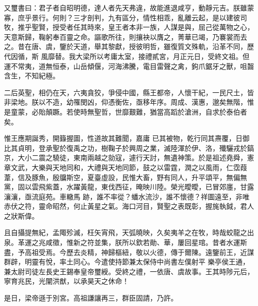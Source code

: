 \begin{pinyinscope}
 又璽書曰：君子者自昭明德，達人者先天弗違，故能進退咸亨，動靜元吉。朕雖蒙寡，庶乎景行。何則？三才剖判，九有區分，情性相乖，亂離云起，是以建彼司牧，推乎聖賢，授受者任其時來，皇王者本非一族，人謀是與，屈己從萬物之心，天意斯歸，鞠躬奉百靈之命。謳歌所往，則攘袂以膺之，菁華已竭，乃褰裳而去之。昔在唐、虞，鑒於天道，舉其黎獻，授彼明哲，雖復質文殊軌，沿革不同，歷代因循，斯
 風靡替。我大梁所以考庸太室，接禮貳宮，月正元日，受終文祖。但運不常夷，道無恒泰，山岳傾偃，河海沸騰，電目雷聲之禽，鉤爪鋸牙之獸，咀齧含生，不知紀極。



 二后英聖，相仍在天，六夷貪狡，爭侵中國，縣王都帝，人懷干紀，一民尺土，皆非梁地。朕以不造，幼罹閔凶，仰憑衡佐，亟移年序。周成、漢惠，邈矣無階，惟是童蒙，必貽顛蹶。若使時無聖哲，世靡艱難，猶當高蹈於滄洲，自求於泰伯者矣。



 惟王應期誕秀，開籙握圖，性道故其難聞，嘉庸
 已其被物，乾行同其燾覆，日御比其貞明，登承聖於復禹之功，樹鞠子於興周之業，滅陸渾於伊、洛，殲驪戎於鎬京，大小二震之驍徒，東南兩越之勍寇，遽行天討，無遺神策。於是祖述堯舜，憲章文武，大樂與天地同和，大禮與天地同節，鼓之以雷霆，潤之以風雨，仁霑葭葦，信及豚魚，殷牖斯空，夏臺虛設，民惟大畜，野有同人，升平頌平，無偏無黨，固以雲飛紫蓋，水躍黃龍，東伐西征，晻映川陸。榮光曖曖，已冒郊廛，甘露瀼瀼，亟流庭苑。車轍馬
 跡，誰不率從？蟠水流沙，誰不懷德？祥圖遠至，非唯赤伏之符，靈命昭然，何止黃星之氣。海口河目，賢聖之表既彰，握旄執鉞，君人之狀斯偉。



 且自攝提無紀，孟陬殄滅，枉矢宵飛，天弧曉映，久矣夷羊之在牧，時哉蛟龍之出泉。革運之兆咸徵，惟新之符並集，朕所以欽若勛、華，屢回星琯。昔者水運斯盡，予高祖受焉。今歷去炎精，神歸樞紐，敬以火德，傳于爾陳。遠鑒前王，近謀群辟，明靈有悅，率土同心。今遣使持節兼太保侍中尚書左僕射平
 樂亭侯王通，兼太尉司徒左長史王錫奉皇帝璽綬。受終之禮，一依唐、虞故事。王其時陟元后，寧育兆民，光闡洪猷，以承昊天之休命！



 是日，梁帝遜于別宮。高祖謙讓再三，群臣固請，乃許。



\end{pinyinscope}